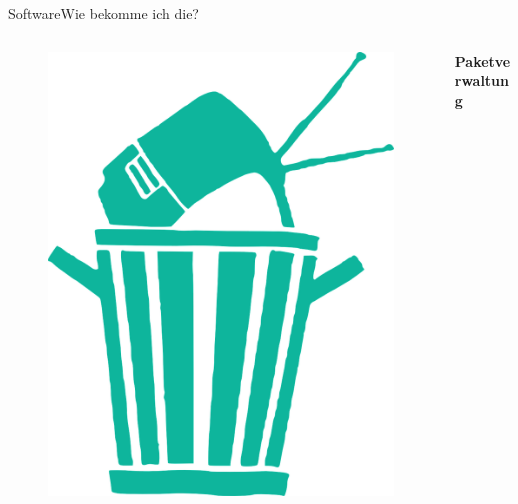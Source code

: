  \begin{frame}{Software}{Wie bekomme ich die?}

  \begin{columns}
  \begin{column}{0.3\textwidth}
 \begin{figure}
 \includegraphics[height=0.5\textheight]{resources/garbage-296550_1280.png}
 \end{figure}
\end{column}
\begin{column}{0.6\textwidth}
 \begin{center}
   \textbf{\large{ Paketverwaltung}}
 \end{center}
  \begin{itemize}

\end{itemize}
\end{column}
\end{columns}
\end{frame}
